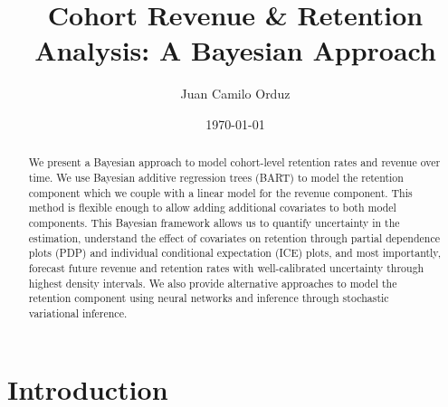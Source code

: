 \documentclass[11pt]{amsart}
\theoremstyle{definition}
\begin{document}
\title{Cohort Revenue \& Retention Analysis: A Bayesian Approach}
\author{Juan Camilo Orduz}
\address{Berlin, Germany}
\date{\today}

\begin{abstract}
    We present a Bayesian approach to model cohort-level retention rates and revenue over time. We use Bayesian additive
    regression trees (BART) to model the retention component which we couple with a linear model for the revenue component.
    This method is flexible enough to allow adding additional covariates to both model components. This Bayesian framework
    allows us to quantify uncertainty in the estimation, understand the effect of covariates on retention through partial
    dependence plots (PDP) and individual conditional expectation (ICE) plots, and most importantly, forecast future
    revenue and retention rates with well-calibrated uncertainty through highest density intervals. We also provide
    alternative approaches to model the retention component using neural networks and inference through stochastic variational
    inference.
\end{abstract}

\maketitle


\section{Introduction}
\end{document}
